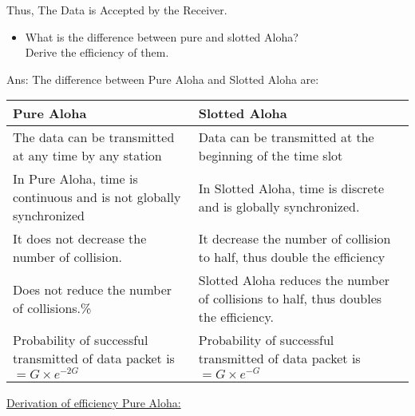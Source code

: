 \documentclass[13pt]{article}
\begin{document}
    \item \Large \vspace{10mm} Thus, The Data is Accepted by the Receiver.
    \vspace{10mm}\hline
\newpage
\begin{itemize}
    \item \Large What is the difference between pure and slotted Aloha?\\  Derive the efficiency of them.\vspace{2mm}
    \end{itemize}
    \item Ans: The difference between Pure Aloha and Slotted Aloha are: \\
   \begin{center}
   \begin{tabular}{||m{7cm}|m{7cm}||}
    \hline Pure Aloha & Slotted Aloha\\ \hline \vspace{1mm} The data can be transmitted at any time by any station & \vspace{1mm}Data can be transmitted at the beginning of the time slot \\ \hline \vspace{1mm} In Pure Aloha, time is continuous and is not globally synchronized  &\vspace*{1mm} In Slotted Aloha, time is discrete and is globally synchronized. \\ \hline \vspace{1mm} It does not decrease the number of collision. &\vspace{1mm} It decrease the number of collision to half, thus double the efficiency \\ \hline \vspace{1mm}Does not reduce the number of collisions.\% &  \vspace{1mm} Slotted Aloha reduces the number of collisions to half, thus doubles the efficiency.\\ \hline\vspace{1mm}  Probability of  successful transmitted of data packet is$=G\times e^{-2G} $ & \vspace{1mm} Probability of  successful transmitted of data packet is  $=G\times e^{-G} $ \\ \hline
   \end{tabular} 
   \end{center}
   \newpage
\item \vspace{8mm} \underline{Derivation of efficiency Pure Aloha:}\\
\end{document}
